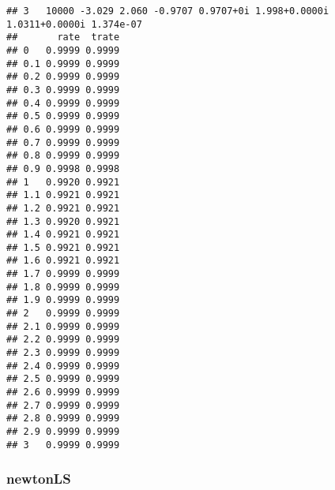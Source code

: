 \documentclass[
  12pt,
]{article}
\begin{document}
\begin{verbatim}
## 3   10000 -3.029 2.060 -0.9707 0.9707+0i 1.998+0.0000i 1.0311+0.0000i 1.374e-07
##       rate  trate
## 0   0.9999 0.9999
## 0.1 0.9999 0.9999
## 0.2 0.9999 0.9999
## 0.3 0.9999 0.9999
## 0.4 0.9999 0.9999
## 0.5 0.9999 0.9999
## 0.6 0.9999 0.9999
## 0.7 0.9999 0.9999
## 0.8 0.9999 0.9999
## 0.9 0.9998 0.9998
## 1   0.9920 0.9921
## 1.1 0.9921 0.9921
## 1.2 0.9921 0.9921
## 1.3 0.9920 0.9921
## 1.4 0.9921 0.9921
## 1.5 0.9921 0.9921
## 1.6 0.9921 0.9921
## 1.7 0.9999 0.9999
## 1.8 0.9999 0.9999
## 1.9 0.9999 0.9999
## 2   0.9999 0.9999
## 2.1 0.9999 0.9999
## 2.2 0.9999 0.9999
## 2.3 0.9999 0.9999
## 2.4 0.9999 0.9999
## 2.5 0.9999 0.9999
## 2.6 0.9999 0.9999
## 2.7 0.9999 0.9999
## 2.8 0.9999 0.9999
## 2.9 0.9999 0.9999
## 3   0.9999 0.9999
\end{verbatim}

\normalsize

\subsubsection{newtonLS}\label{newtonls-1}

\footnotesize
\end{document}
